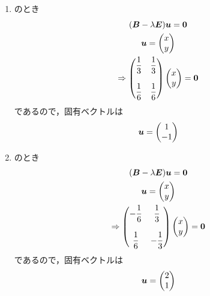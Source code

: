 \begin{ans*}
\begin{enumerate}[label=(\arabic*)]
    \begin{enumerate}[label=(\roman*)]
      \item {}のとき
      \begin{gather}
        (\bm{B} -\lambda\bm{E}){\bm{u}} = \bm{0} \\
        {\bm{u}} = \begin{pmatrix} x \\ y \end{pmatrix} \\
        \Rightarrow
        \begin{pmatrix}
          {\displaystyle\frac{1}{3}} & {\displaystyle\frac{1}{3}} \\&\\ {\displaystyle\frac{1}{6}} & {\displaystyle\frac{1}{6}}
        \end{pmatrix}
        \begin{pmatrix}
          x \\ y
        \end{pmatrix}
        =\bm{0}
      \end{gather}
      であるので，固有ベクトルは
      \begin{gather}
        {\bm{u}} = 
        \begin{pmatrix}
          1 \\ -1
        \end{pmatrix}
      \end{gather}
      \item {}のとき
      \begin{gather}
        (\bm{B} -\lambda\bm{E}){\bm{u}} = \bm{0} \\
        {\bm{u}} = \begin{pmatrix} x \\ y \end{pmatrix} \\
        \Rightarrow
        \begin{pmatrix}
          {\displaystyle-\frac{1}{6}} & {\displaystyle\frac{1}{3}} \\&\\ {\displaystyle\frac{1}{6}} & {\displaystyle -\frac{1}{3}}
        \end{pmatrix}
        \begin{pmatrix}
          x \\ y
        \end{pmatrix}
        =\bm{0}
      \end{gather}
      であるので，固有ベクトルは
      \begin{gather}
        {\bm{u}} = 
        \begin{pmatrix}
          2 \\ 1
        \end{pmatrix}
      \end{gather}
    \end{enumerate}


\end{enumerate}
\end{ans*}
